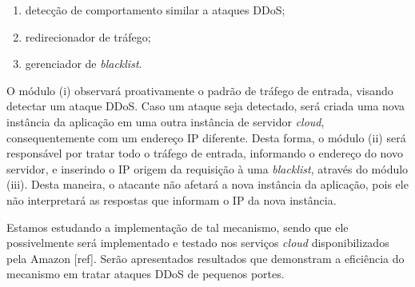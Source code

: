 \documentclass[a4paper, 11pt]{article}
\begin{document}
\begin{enumerate}[i]
  \item detecção de comportamento similar a ataques DDoS;
  \item redirecionador de tráfego;
  \item gerenciador de \emph{blacklist}. 
\end{enumerate}

O módulo (i) observará proativamente o padrão de tráfego de entrada, visando detectar um ataque DDoS. Caso um ataque seja detectado, será criada uma nova instância da aplicação em uma outra instância de servidor \emph{cloud}, consequentemente com um endereço IP diferente. Desta forma, o módulo (ii) será responsável por tratar todo o tráfego de entrada, informando o endereço do novo servidor, e inserindo o IP origem da requisição à uma \emph{blacklist}, através do módulo (iii). Desta maneira, o atacante não afetará a nova instância da aplicação, pois ele não interpretará as respostas que informam o IP da nova instância. 

Estamos estudando a implementação de tal mecanismo, sendo que ele possivelmente será implementado e testado nos serviços \emph{cloud} disponibilizados pela Amazon [ref]. Serão apresentados resultados que demonstram a eficiência do mecanismo em tratar ataques DDoS de pequenos portes.






\end{document}
